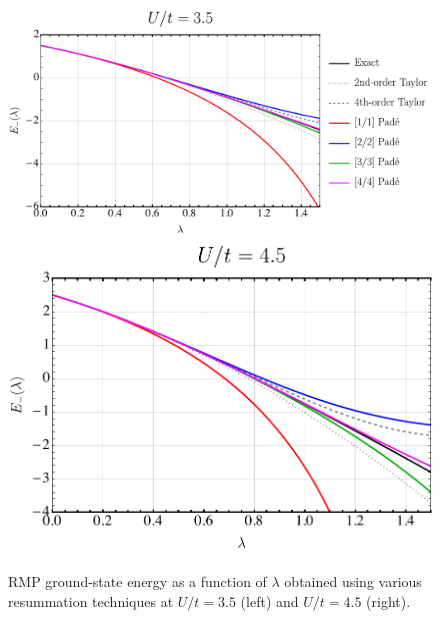 \documentclass[aps,prb,reprint,noshowkeys,linenumbers,superscriptaddress]{revtex4-1}
\begin{document}
\begin{figure}
    \includegraphics[height=0.23\textheight]{PadeRMP35}
    \includegraphics[height=0.23\textheight]{PadeRMP45}
    \caption{\label{fig:PadeRMP}
    RMP ground-state energy as a function of $\lambda$ obtained using various resummation techniques at $U/t = 3.5$ (left) and $U/t = 4.5$ (right).}
\end{figure}

\end{document}
